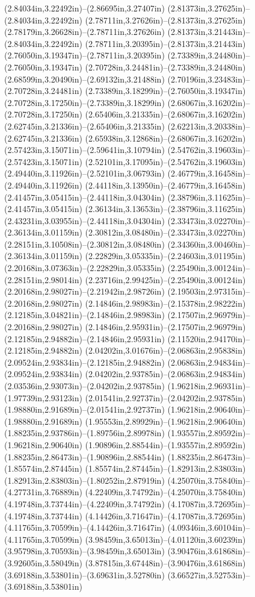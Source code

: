 (2.84034in,3.22492in)--(2.86695in,3.27407in) (2.81373in,3.27625in)--(2.84034in,3.22492in) (2.78711in,3.27626in)--(2.81373in,3.27625in) (2.78179in,3.26628in)--(2.78711in,3.27626in) (2.81373in,3.21443in)--(2.84034in,3.22492in) (2.78711in,3.20395in)--(2.81373in,3.21443in) (2.76050in,3.19347in)--(2.78711in,3.20395in) (2.73389in,3.24480in)--(2.76050in,3.19347in) (2.70728in,3.24481in)--(2.73389in,3.24480in) (2.68599in,3.20490in)--(2.69132in,3.21488in) (2.70196in,3.23483in)--(2.70728in,3.24481in) (2.73389in,3.18299in)--(2.76050in,3.19347in) (2.70728in,3.17250in)--(2.73389in,3.18299in) (2.68067in,3.16202in)--(2.70728in,3.17250in) (2.65406in,3.21335in)--(2.68067in,3.16202in) (2.62745in,3.21336in)--(2.65406in,3.21335in) (2.62213in,3.20338in)--(2.62745in,3.21336in) (2.65938in,3.12868in)--(2.68067in,3.16202in) (2.57423in,3.15071in)--(2.59641in,3.10794in) (2.54762in,3.19603in)--(2.57423in,3.15071in) (2.52101in,3.17095in)--(2.54762in,3.19603in) (2.49440in,3.11926in)--(2.52101in,3.06793in) (2.46779in,3.16458in)--(2.49440in,3.11926in) (2.44118in,3.13950in)--(2.46779in,3.16458in) (2.41457in,3.05415in)--(2.44118in,3.04304in) (2.38796in,3.11625in)--(2.41457in,3.05415in) (2.36134in,3.13653in)--(2.38796in,3.11625in) (2.43231in,3.03955in)--(2.44118in,3.04304in) (2.33473in,3.02270in)--(2.36134in,3.01159in) (2.30812in,3.08480in)--(2.33473in,3.02270in) (2.28151in,3.10508in)--(2.30812in,3.08480in) (2.34360in,3.00460in)--(2.36134in,3.01159in) (2.22829in,3.05335in)--(2.24603in,3.01195in) (2.20168in,3.07363in)--(2.22829in,3.05335in) (2.25490in,3.00124in)--(2.28151in,2.98014in) (2.23716in,2.99425in)--(2.25490in,3.00124in) (2.20168in,2.98027in)--(2.21942in,2.98726in) (2.19503in,2.97315in)--(2.20168in,2.98027in) (2.14846in,2.98983in)--(2.15378in,2.98222in) (2.12185in,3.04821in)--(2.14846in,2.98983in) (2.17507in,2.96979in)--(2.20168in,2.98027in) (2.14846in,2.95931in)--(2.17507in,2.96979in) (2.12185in,2.94882in)--(2.14846in,2.95931in) (2.11520in,2.94170in)--(2.12185in,2.94882in) (2.04202in,3.01676in)--(2.06863in,2.95838in) (2.09524in,2.93834in)--(2.12185in,2.94882in) (2.06863in,2.94834in)--(2.09524in,2.93834in) (2.04202in,2.93785in)--(2.06863in,2.94834in) (2.03536in,2.93073in)--(2.04202in,2.93785in) (1.96218in,2.96931in)--(1.97739in,2.93123in) (2.01541in,2.92737in)--(2.04202in,2.93785in) (1.98880in,2.91689in)--(2.01541in,2.92737in) (1.96218in,2.90640in)--(1.98880in,2.91689in) (1.95553in,2.89929in)--(1.96218in,2.90640in) (1.88235in,2.93786in)--(1.89756in,2.89978in) (1.93557in,2.89592in)--(1.96218in,2.90640in) (1.90896in,2.88544in)--(1.93557in,2.89592in) (1.88235in,2.86473in)--(1.90896in,2.88544in) (1.88235in,2.86473in)--(1.85574in,2.87445in) (1.85574in,2.87445in)--(1.82913in,2.83803in) (1.82913in,2.83803in)--(1.80252in,2.87919in) (4.25070in,3.75840in)--(4.27731in,3.76889in) (4.22409in,3.74792in)--(4.25070in,3.75840in) (4.19748in,3.73744in)--(4.22409in,3.74792in) (4.17087in,3.72695in)--(4.19748in,3.73744in) (4.14426in,3.71647in)--(4.17087in,3.72695in) (4.11765in,3.70599in)--(4.14426in,3.71647in) (4.09346in,3.60104in)--(4.11765in,3.70599in) (3.98459in,3.65013in)--(4.01120in,3.60239in) (3.95798in,3.70593in)--(3.98459in,3.65013in) (3.90476in,3.61868in)--(3.92605in,3.58049in) (3.87815in,3.67448in)--(3.90476in,3.61868in) (3.69188in,3.53801in)--(3.69631in,3.52780in) (3.66527in,3.52753in)--(3.69188in,3.53801in) 